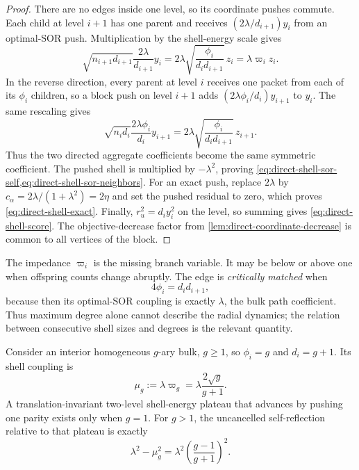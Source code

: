 \begin{proof}
There are no edges inside one level, so its coordinate pushes commute.  Each
child at level $i+1$ has one parent and receives
$(2\lambda/d_{i+1})y_i$ from an optimal-SOR push.  Multiplication by the
shell-energy scale gives
\begin{equation*}
 \sqrt{n_{i+1}d_{i+1}}\frac{2\lambda}{d_{i+1}}y_i
 =2\lambda\sqrt{\frac{\phi_i}{d_i d_{i+1}}}\,z_i
 =\lambda\varpi_i z_i.
\end{equation*}
In the reverse direction, every parent at level $i$ receives one packet from
each of its $\phi_i$ children, so a block push on level $i+1$ adds
$(2\lambda\phi_i/d_i)y_{i+1}$ to $y_i$.  The same rescaling gives
\begin{equation*}
 \sqrt{n_i d_i}\frac{2\lambda\phi_i}{d_i}y_{i+1}
 =2\lambda\sqrt{\frac{\phi_i}{d_i d_{i+1}}}\,z_{i+1}.
\end{equation*}
Thus the two directed aggregate coefficients become the same symmetric
coefficient.  The pushed shell is multiplied by $-\lambda^2$, proving
\cref{eq:direct-shell-sor-self,eq:direct-shell-sor-neighbors}.  For an exact
push, replace $2\lambda$ by
$c_\alpha=2\lambda/(1+\lambda^2)=2\eta$ and set the pushed residual to zero,
which proves \cref{eq:direct-shell-exact}.  Finally,
$r_u^2=d_i y_i^2$ on the level, so summing gives
\cref{eq:direct-shell-score}.  The objective-decrease factor from
\cref{lem:direct-coordinate-decrease} is common to all vertices of the block.
\end{proof}

The impedance $\varpi_i$ is the missing branch variable.  It may be below or
above one when offspring counts change abruptly.  The edge is
\emph{critically matched} when
\begin{equation}
 4\phi_i=d_i d_{i+1},
 \label{eq:direct-critical-impedance}
\end{equation}
because then its optimal-SOR coupling is exactly $\lambda$, the bulk path
coefficient.  Thus maximum degree alone cannot describe the radial dynamics;
the relation between consecutive shell sizes and degrees is the relevant
quantity.

\begin{proposition}
\label{prop:direct-homogeneous-criticality}
Consider an interior homogeneous $g$-ary bulk, $g\geq1$, so
$\phi_i=g$ and $d_i=g+1$.  Its shell coupling is
\begin{equation}
 \mu_g:=\lambda\varpi_g
 =\lambda\frac{2\sqrt g}{g+1}.
 \label{eq:direct-homogeneous-coupling}
\end{equation}
A translation-invariant two-level shell-energy plateau that advances by
pushing one parity exists only when $g=1$.  For $g>1$, the uncancelled
self-reflection relative to that plateau is exactly
\begin{equation}
 \lambda^2-\mu_g^2
 =\lambda^2\left(\frac{g-1}{g+1}\right)^2.
 \label{eq:direct-branch-mismatch-debt}
\end{equation}
\end{proposition}

